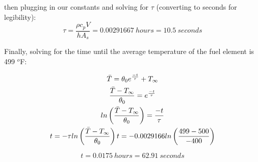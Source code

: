 \documentclass{article}
\begin{document}
then plugging in our constants and solving for $\tau$ (converting to seconds for legibility):
\[
\boxed{\tau = \frac{\rho c_p V}{h A_s} = 0.00291667 \ hours = 10.5 \ seconds}
\]

Finally, solving for the time until the average temperature of the fuel element is 499 $^o$F:

\begin{equation}
    \begin{gathered}
        \Bar{T} = \theta_0 e^{\frac{-t}{\tau}} + T_{\infty} \\
        \frac{\Bar{T} - T_{\infty}}{\theta_0} = e^{\frac{-t}{\tau}} \\
        ln\left(\frac{\Bar{T} - T_{\infty}}{\theta_0}\right) = \frac{-t}{\tau} \\
        t = -\tau ln\left(\frac{\Bar{T} - T_{\infty}}{\theta_0}\right)
        t = - 0.0029166 ln\left(\frac{499 - 500}{-400}\right)
    \end{gathered}
\end{equation}

\[
\boxed{t = 0.0175 \ hours = 62.91 \ seconds}
\]
\end{document}
